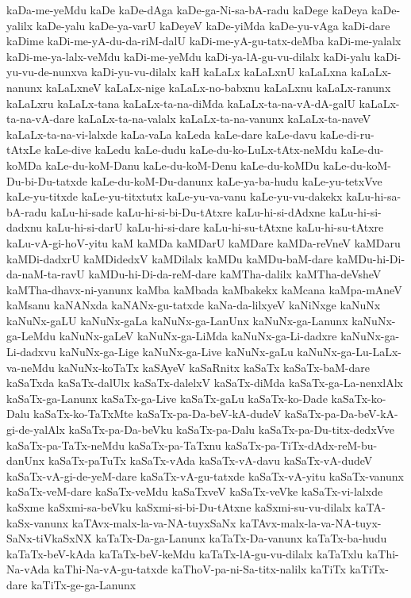 {kaDa-me-yeMdu
kaDe
kaDe-dAga
kaDe-ga-Ni-sa-bA-radu
kaDege
kaDeya
kaDe-yalilx
kaDe-yalu
kaDe-ya-varU
kaDeyeV
kaDe-yiMda
kaDe-yu-vAga
kaDi-dare
kaDime
kaDi-me-yA-du-da-riM-dalU
kaDi-me-yA-gu-tatx-deMba
kaDi-me-yalalx
kaDi-me-ya-lalx-veMdu
kaDi-me-yeMdu
kaDi-ya-lA-gu-vu-dilalx
kaDi-yalu
kaDi-yu-vu-de-nunxva
kaDi-yu-vu-dilalx
kaH
kaLaLx
kaLaLxnU
kaLaLxna
kaLaLx-nanunx
kaLaLxneV
kaLaLx-nige
kaLaLx-no-babxnu
kaLaLxnu
kaLaLx-ranunx
kaLaLxru
kaLaLx-tana
kaLaLx-ta-na-diMda
kaLaLx-ta-na-vA-dA-galU
kaLaLx-ta-na-vA-dare
kaLaLx-ta-na-valalx
kaLaLx-ta-na-vanunx
kaLaLx-ta-naveV
kaLaLx-ta-na-vi-lalxde
kaLa-vaLa
kaLeda
kaLe-dare
kaLe-davu
kaLe-di-ru-tAtxLe
kaLe-dive
kaLedu
kaLe-dudu
kaLe-du-ko-LuLx-tAtx-neMdu
kaLe-du-koMDa
kaLe-du-koM-Danu
kaLe-du-koM-Denu
kaLe-du-koMDu
kaLe-du-koM-Du-bi-Du-tatxde
kaLe-du-koM-Du-danunx
kaLe-ya-ba-hudu
kaLe-yu-tetxVve
kaLe-yu-titxde
kaLe-yu-titxtutx
kaLe-yu-va-vanu
kaLe-yu-vu-dakekx
kaLu-hi-sa-bA-radu
kaLu-hi-sade
kaLu-hi-si-bi-Du-tAtxre
kaLu-hi-si-dAdxne
kaLu-hi-si-dadxnu
kaLu-hi-si-darU
kaLu-hi-si-dare
kaLu-hi-su-tAtxne
kaLu-hi-su-tAtxre
kaLu-vA-gi-hoV-yitu
kaM
kaMDa
kaMDarU
kaMDare
kaMDa-reVneV
kaMDaru
kaMDi-dadxrU
kaMDidedxV
kaMDilalx
kaMDu
kaMDu-baM-dare
kaMDu-hi-Di-da-naM-ta-ravU
kaMDu-hi-Di-da-reM-dare
kaMTha-dalilx
kaMTha-deVsheV
kaMTha-dhavx-ni-yanunx
kaMba
kaMbada
kaMbakekx
kaMcana
kaMpa-mAneV
kaMsanu
kaNANxda
kaNANx-gu-tatxde
kaNa-da-lilxyeV
kaNiNxge
kaNuNx
kaNuNx-gaLU
kaNuNx-gaLa
kaNuNx-ga-LanUnx
kaNuNx-ga-Lanunx
kaNuNx-ga-LeMdu
kaNuNx-gaLeV
kaNuNx-ga-LiMda
kaNuNx-ga-Li-dadxre
kaNuNx-ga-Li-dadxvu
kaNuNx-ga-Lige
kaNuNx-ga-Live
kaNuNx-gaLu
kaNuNx-ga-Lu-LaLx-va-neMdu
kaNuNx-koTaTx
kaSAyeV
kaSaRnitx
kaSaTx
kaSaTx-baM-dare
kaSaTxda
kaSaTx-dalUlx
kaSaTx-dalelxV
kaSaTx-diMda
kaSaTx-ga-La-nenxlAlx
kaSaTx-ga-Lanunx
kaSaTx-ga-Live
kaSaTx-gaLu
kaSaTx-ko-Dade
kaSaTx-ko-Dalu
kaSaTx-ko-TaTxMte
kaSaTx-pa-Da-beV-kA-dudeV
kaSaTx-pa-Da-beV-kA-gi-de-yalAlx
kaSaTx-pa-Da-beVku
kaSaTx-pa-Dalu
kaSaTx-pa-Du-titx-dedxVve
kaSaTx-pa-TaTx-neMdu
kaSaTx-pa-TaTxnu
kaSaTx-pa-TiTx-dAdx-reM-bu-danUnx
kaSaTx-paTuTx
kaSaTx-vAda
kaSaTx-vA-davu
kaSaTx-vA-dudeV
kaSaTx-vA-gi-de-yeM-dare
kaSaTx-vA-gu-tatxde
kaSaTx-vA-yitu
kaSaTx-vanunx
kaSaTx-veM-dare
kaSaTx-veMdu
kaSaTxveV
kaSaTx-veVke
kaSaTx-vi-lalxde
kaSxme
kaSxmi-sa-beVku
kaSxmi-si-bi-Du-tAtxne
kaSxmi-su-vu-dilalx
kaTA-kaSx-vanunx
kaTAvx-malx-la-va-NA-tuyxSaNx
kaTAvx-malx-la-va-NA-tuyx-SaNx-tiVkaSxNX
kaTaTx-Da-ga-Lanunx
kaTaTx-Da-vanunx
kaTaTx-ba-hudu
kaTaTx-beV-kAda
kaTaTx-beV-keMdu
kaTaTx-lA-gu-vu-dilalx
kaTaTxlu
kaThi-Na-vAda
kaThi-Na-vA-gu-tatxde
kaThoV-pa-ni-Sa-titx-nalilx
kaTiTx
kaTiTx-dare
kaTiTx-ge-ga-Lanunx
}
